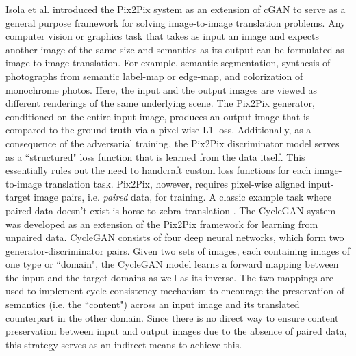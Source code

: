 Isola et al. \cite{isola2017image} introduced the Pix2Pix system as an extension of cGAN to serve as a general purpose framework for solving image-to-image translation problems. Any computer vision or graphics task that takes as input an image and expects another image of the same size and semantics as its output can be formulated as image-to-image translation. For example, semantic segmentation, synthesis of photographs from semantic label-map or edge-map, and colorization of monochrome photos. Here, the input and the output images are viewed as different renderings of the same underlying scene. The Pix2Pix generator, conditioned on the entire input image, produces an output image that is compared to the ground-truth via a pixel-wise L1 loss. Additionally, as a consequence of the adversarial training, the Pix2Pix discriminator model serves as a ``structured" loss function that is learned from the data itself. This essentially rules out the need to handcraft custom loss functions for each image-to-image translation task. Pix2Pix, however, requires pixel-wise aligned input-target image pairs, i.e. \textit{paired} data, for training. A classic example task where paired data doesn't exist is horse-to-zebra translation \cite{zhu2017unpaired}. The CycleGAN system \cite{zhu2017unpaired} was developed as an extension of the Pix2Pix framework for learning from unpaired data. CycleGAN consists of four deep neural networks, which form two generator-discriminator pairs. Given two sets of images, each containing images of one type or ``domain", the CycleGAN model learns a forward mapping between the input and the target domains as well as its inverse. The two mappings are used to implement cycle-consistency mechanism to encourage the preservation of semantics (i.e. the ``content") across an input image and its translated counterpart in the other domain. Since there is no direct way to ensure content preservation between input and output images due to the absence of paired data, this strategy serves as an indirect means to achieve this.

